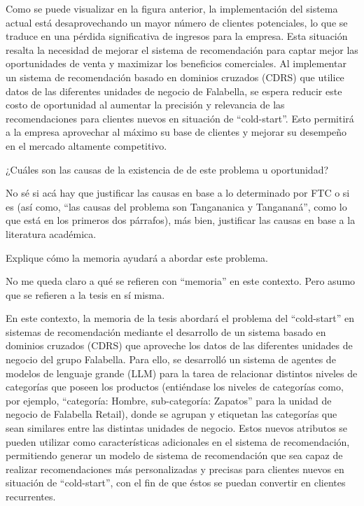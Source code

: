 Como se puede visualizar en la figura anterior, la implementación del sistema actual está desaprovechando un mayor número de clientes potenciales, lo que se traduce en una pérdida significativa de ingresos para la empresa. Esta situación resalta la necesidad de mejorar el sistema de recomendación para captar mejor las oportunidades de venta y maximizar los beneficios comerciales. Al implementar un sistema de recomendación basado en dominios cruzados (CDRS) que utilice datos de las diferentes unidades de negocio de Falabella, se espera reducir este costo de oportunidad al aumentar la precisión y relevancia de las recomendaciones para clientes nuevos en situación de \enquote{cold-start}. Esto permitirá a la empresa aprovechar al máximo su base de clientes y mejorar su desempeño en el mercado altamente competitivo.

¿Cuáles son las causas de la existencia de de este problema u oportunidad?

No sé si acá hay que justificar las causas en base a lo determinado por FTC o si es (así como, \enquote{las causas del problema son Tangananica y Tangananá}, como lo que está en los primeros dos párrafos), más bien, justificar las causas en base a la literatura académica.

Explique cómo la memoria ayudará a abordar este problema.

No me queda claro a qué se refieren con \enquote{memoria} en este contexto. Pero asumo que se refieren a la tesis en sí misma.

En este contexto, la memoria de la tesis abordará el problema del \enquote{cold-start} en sistemas de recomendación mediante el desarrollo de un sistema basado en dominios cruzados (CDRS) que aproveche los datos de las diferentes unidades de negocio del grupo Falabella. Para ello, se desarrolló un sistema de agentes de modelos de lenguaje grande (LLM) para la tarea de relacionar distintos niveles de categorías que poseen los productos (entiéndase los niveles de categorías como, por ejemplo, \enquote{categoría: Hombre, sub-categoría: Zapatos} para la unidad de negocio de Falabella Retail), donde se agrupan y etiquetan las categorías que sean similares entre las distintas unidades de negocio. Estos nuevos atributos se pueden utilizar como características adicionales en el sistema de recomendación, permitiendo generar un modelo de sistema de recomendación que sea capaz de realizar recomendaciones más personalizadas y precisas para clientes nuevos en situación de \enquote{cold-start}, con el fin de que éstos se puedan convertir en clientes recurrentes.